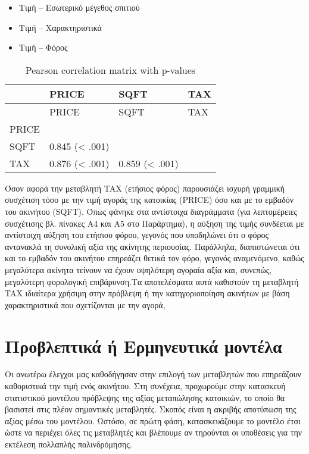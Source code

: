 \documentclass[
  10pt,
]{article}
\begin{document}
\begin{itemize}
  \item Τιμή -- Εσωτερικό μέγεθος σπιτιού
  \item Τιμή -- Χαρακτηριστικά
  \item Τιμή -- Φόρος
\end{itemize}

\begin{longtable}[]{@{}llll@{}}
\caption{Pearson correlation matrix with p-values}\tabularnewline
\toprule\noalign{}
& PRICE & SQFT & TAX \\
\midrule\noalign{}
\endfirsthead
\toprule\noalign{}
& PRICE & SQFT & TAX \\
\midrule\noalign{}
\endhead
\bottomrule\noalign{}
\endlastfoot
PRICE & & & \\
SQFT & 0.845 (\textless{} .001) & & \\
TAX & 0.876 (\textless{} .001) & 0.859 (\textless{} .001) & \\
\end{longtable}

Όσον αφορά την μεταβλητή TAX (ετήσιος φόρος) παρουσιάζει ισχυρή γραμμική
συσχέτιση τόσο με την τιμή αγοράς της κατοικίας (PRICE) όσο και με το
εμβαδόν του ακινήτου (SQFT). Όπως φάνηκε στα αντίστοιχα διαγράμματα (για
λεπτομέρειες συσχέτισης βλ. πίνακες Α4 και Α5 στο Παράρτημα), η αύξηση
της τιμής συνδέεται με αντίστοιχη αύξηση του ετήσιου φόρου, γεγονός που
υποδηλώνει ότι ο φόρος αντανακλά τη συνολική αξία της ακίνητης
περιουσίας. Παράλληλα, διαπιστώνεται ότι και το εμβαδόν του ακινήτου
επηρεάζει θετικά τον φόρο, γεγονός αναμενόμενο, καθώς μεγαλύτερα ακίνητα
τείνουν να έχουν υψηλότερη αγοραία αξία και, συνεπώς, μεγαλύτερη
φορολογική επιβάρυνση.Τα αποτελέσματα αυτά καθιστούν τη μεταβλητή TAX
ιδιαίτερα χρήσιμη στην πρόβλεψη ή την κατηγοριοποίηση ακινήτων με βάση
χαρακτηριστικά που σχετίζονται με την αγορά,

\section*{Προβλεπτικά ή Ερμηνευτικά μοντέλα}

Οι ανωτέρω έλεγχοι μας καθοδήγησαν στην επιλογή των μεταβλητών που
επηρεάζουν καθοριστικά την τιμή ενός ακινήτου. Στη συνέχεια, προχωρούμε
στην κατασκευή στατιστικού μοντέλου πρόβλεψης της αξίας μεταπώλησης
κατοικιών, το οποίο θα βασιστεί στις πλέον σημαντικές μεταβλητές. Σκοπός
είναι η ακριβής αποτύπωση της αξίας μέσω του μοντέλου. Ωστόσο, σε πρώτη
φάση, κατασκευάζουμε το μοντέλο έτσι ώστε να περιέχει όλες τις
μεταβλητές και βλέπουμε αν τηρούνται οι υποθέσεις για την εκτέλεση
πολλαπλής παλινδρόμησης.
\end{document}
